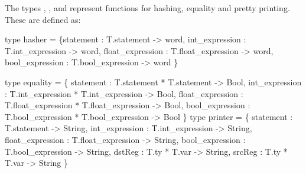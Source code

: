 The types , ,
and  represent functions for hashing,
equality and pretty printing.   These are defined as:
\begin{SML} 
   type hasher =
      \{statement    : T.statement -> word,
       int_expression   : T.int_expression -> word,
       float_expression   : T.float_expression -> word,
       bool_expression  : T.bool_expression -> word
      \}    

   type equality =
      \{ statement    : T.statement * T.statement -> Bool,
        int_expression   : T.int_expression * T.int_expression -> Bool,
        float_expression   : T.float_expression * T.float_expression -> Bool,
        bool_expression  : T.bool_expression * T.bool_expression -> Bool
      \} 
   type printer =
      \{ statement    : T.statement -> String,
        int_expression   : T.int_expression -> String,
        float_expression   : T.float_expression -> String,
        bool_expression  : T.bool_expression -> String,
        dstReg : T.ty * T.var -> String,
        srcReg : T.ty * T.var -> String
      \}
\end{SML}

